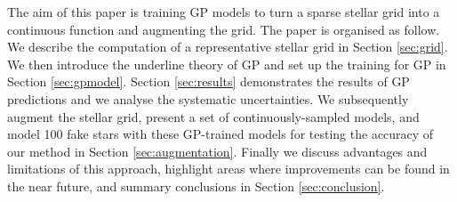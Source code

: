 The aim of this paper is training GP models to turn a sparse stellar grid into a continuous function and augmenting the grid. The paper is organised as follow. We describe the computation of a representative stellar grid in Section \ref{sec:grid}. We then introduce the underline theory of GP and set up the training for GP in Section \ref{sec:gpmodel}. Section \ref{sec:results} demonstrates the results of GP predictions and we analyse the systematic uncertainties. We subsequently augment the stellar grid,  present a set of continuously-sampled models, and model 100 fake stars with these GP-trained models for testing the accuracy of our method in Section \ref{sec:augmentation}. 
Finally we discuss advantages and limitations of this approach, highlight areas where improvements can be found in the near future, and summary conclusions in Section \ref{sec:conclusion}.










